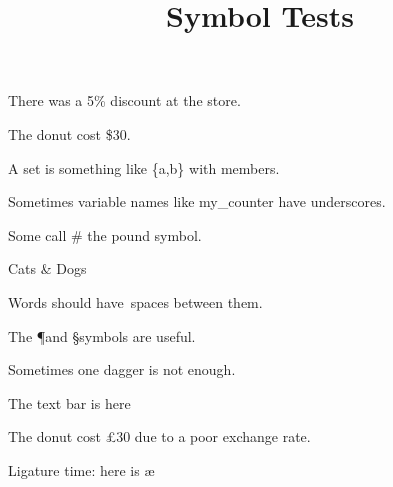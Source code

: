 \documentclass{article}
\title{Symbol Tests}
\begin{document}
There was a 5\% discount at the store.

The donut cost \$30.

A set is something like \{a,b\} with members.

Sometimes variable names like my\_counter have underscores.

Some call \# the pound symbol.

Cats \& Dogs

Words should have\ spaces between them.

The \P and \S symbols are useful.

Sometimes \ddag one dagger \dag is not enough.

The text bar is here \textbar

The donut cost \pounds30 due to a poor exchange rate.

Ligature time: here is \ae
\end{document}
